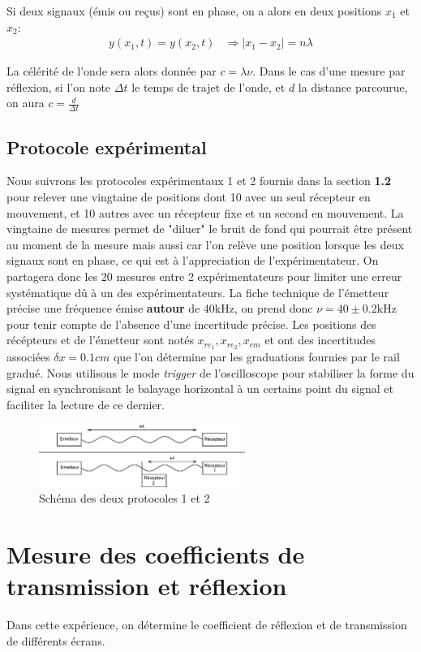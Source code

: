 \documentclass[12pt]{article}
\begin{document}
Si deux signaux (émis ou reçus) sont en phase, on a alors en deux positions $x_1$ et $x_2$:
\begin{align*}
	y(x_1, t) = y(x_2, t) & \Rightarrow |x_1 - x_2| = n\lambda
\end{align*}

La célérité de l'onde sera alors donnée par $c = \lambda \nu$. Dans le cas d'une mesure par réflexion, si l'on note $\Delta t$ le temps de trajet de l'onde, et $d$ la distance parcourue, on aura $c = \frac{d}{\Delta t}$

\subsection{Protocole expérimental}
Nous suivrons les protocoles expérimentaux 1 et 2 fournis dans la section \textbf{1.2} pour relever une vingtaine de positions dont 10 avec un seul récepteur en mouvement, et 10 autres
avec un récepteur fixe et un second en mouvement. La vingtaine de mesures permet de "diluer" le bruit de fond qui pourrait être présent au moment de la mesure mais aussi car l'on relève une position
lorsque les deux signaux sont en phase, ce qui est à l'appreciation de l'expérimentateur. On partagera donc les 20 mesures entre 2 expérimentateurs pour limiter une erreur systématique dû à un des expérimentateurs. 
La fiche technique de l'émetteur précise une fréquence émise \textbf{autour} de 40kHz, on prend donc $\nu = 40 \pm 0.2 \text{kHz}$ pour tenir compte de l'absence d'une incertitude précise. 
Les positions des récépteurs et de l'émetteur sont notés $x_{re_1}, x_{re_2}, x_{em}$ et ont des incertitudes associées
$\delta x = 0.1cm$ que l'on détermine par les graduations fournies par le rail gradué. 
Nous utilisons le mode \textit{trigger}
de l'oscilloscope pour stabiliser la forme du signal en synchronisant le balayage horizontal à un certains point du signal et faciliter la lecture de ce dernier.
\begin{figure}[!htbp]
	\centering
	\includegraphics[width=0.6\textwidth]{img/schema}
	\hfill
	\caption{Schéma des deux protocoles 1 et 2}
\end{figure}

\break
\section{Mesure des coefficients de transmission et réflexion}
Dans cette expérience, on détermine le coefficient de réflexion et de transmission de différents écrans. 
\end{document}
